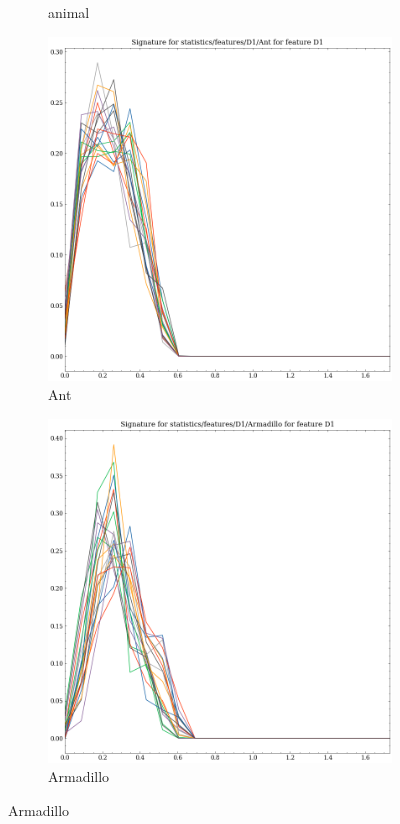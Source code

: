 \begin{figure}[t!p]
\begin{subfigure}[b]{0.23\textwidth}
        \caption{animal}
        \label{fig:features-statistics-D1-b}    
    \end{subfigure}
    \hfill
    \begin{subfigure}[b]{0.23\textwidth}
        \includegraphics[width=\textwidth]{assets/feature_extraction/D1/Ant.png}
        \caption{Ant}
        \label{fig:features-statistics-D1-c}    
    \end{subfigure}
    \hfill    
    \begin{subfigure}[b]{0.23\textwidth}
        \includegraphics[width=\textwidth]{assets/feature_extraction/D1/Armadillo.png}
        \caption{Armadillo}
        \label{fig:features-statistics-D1-d}    
    \end{subfigure}
    \hfill
    

\end{figure}
